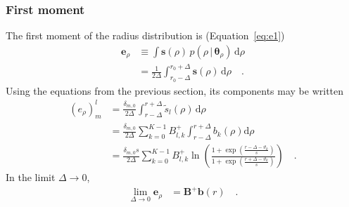 \documentclass[modern]{aastex62}
\begin{document}
\subsubsection{First moment}
%
The first moment of the radius distribution is (Equation~\ref{eq:e1})
%
\begin{align}
    \mathbf{e}_\rho
     & \equiv
    \int
    \mathbf{s}(\rho) \,
    p(\rho \, \big| \, \pmb{\theta}_{\rho}) \,
    \mathrm{d}\rho
    \nonumber \\
     & =
    \frac{1}{2\Delta}
    \int_{r_0 - \Delta}^{r_0 + \Delta}
    \mathbf{s}(\rho) \,
    \mathrm{d}\rho
    \quad.
\end{align}
%
Using the equations from the previous section, its components may be written
%
\begin{align}
    (e_\rho)^l_m
     & =
    \frac{\delta_{m,0}}{2\Delta}
    \int_{r - \Delta}^{r+ \Delta}
    \tilde{s}_{l}(\rho) \,
    \mathrm{d}\rho
    \nonumber \\
     & =
    \frac{\delta_{m,0}}{2\Delta}
    \sum_{k=0}^{K-1} B^+_{l,k}
    \int_{r - \Delta}^{r + \Delta}
    b_{k}(\rho)
    \mathrm{d}\rho
    \nonumber \\
     & =
    \frac{\delta_{m,0} s}{2\Delta}
    \sum_{k=0}^{K-1} B^+_{l,k}
    \ln
    \left(
    \frac{
        1+\exp\left(\frac{r -\Delta -\vartheta_k}{s}\right)
    }
    {
        1+\exp\left(\frac{r + \Delta -\vartheta_k}{s}\right)
    }
    \right)
    \quad.
\end{align}
%
In the limit $\Delta \rightarrow 0$,
%
\begin{align}
    \lim_{\Delta \rightarrow 0}
    \mathbf{e}_\rho
     & =
    \mathbf{B}^+ \mathbf{b}(r)
    \quad.
\end{align}
%
\end{document}
